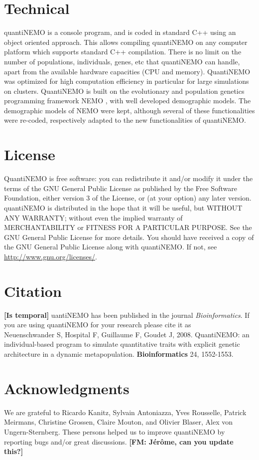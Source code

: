 \documentclass[letterpaper,12pt,oneside]{book}
\newcommand{\fm}[1]{\small {\bf \color{blue} [FM:  #1]} \normalsize}
\newcommand{\tbc}[1]{\small {\bf \color{red} [Is temporal]} \normalsize} %
\begin{document}
\section{Technical}
quantiNEMO is a console program, and is coded in standard C++ using an object oriented approach. This allows compiling quantiNEMO on any computer platform which supports standard C++ compilation. There is no limit on the number of populations, individuals, genes, etc that quantiNEMO can handle, apart from the available hardware capacities (CPU and memory). QuantiNEMO was optimized for high computation efficiency in particular for large simulations on clusters. QuantiNEMO is built on the evolutionary and population genetics programming framework NEMO \citep{Guillaume_2006}, with well developed demographic models. The demographic models of NEMO were kept, although several of these functionalities were re-coded, respectively adapted to the new functionalities of quantiNEMO.

\section{License}
QuantiNEMO is free software: you can redistribute it and/or modify it under the terms of the GNU General Public License as published by the Free Software Foundation, either version 3 of the License, or (at your option) any later version. quantiNEMO is distributed in the hope that it will be useful, but WITHOUT ANY WARRANTY; without even the implied warranty of MERCHANTABILITY or FITNESS FOR A PARTICULAR PURPOSE.  See the GNU General Public License for more details. You should have received a copy of the GNU General Public License along with quantiNEMO. If not, see \linebreak\url{http://www.gnu.org/licenses/}.

\section{Citation}
\tbc
quantiNEMO has been published in the journal \textit{Bioinformatics}. If you are using quantiNEMO for your research please cite it as \\
 Neuenschwander S, Hospital F, Guillaume F, Goudet J, 2008. QuantiNEMO: an individual-based program to simulate quantitative traits with explicit genetic architecture in a dynamic metapopulation. \textbf{Bioinformatics} 24, 1552-1553.

\section{Acknowledgments}
We are grateful to Ricardo Kanitz, Sylvain Antoniazza, Yves Rousselle, Patrick Meirmans, Christine Grossen, Claire Mouton, and Olivier Blaser, Alex von Ungern-Sternberg. These persons helped us to improve quantiNEMO by reporting bugs and/or great discussions. 
\fm{Jérôme, can you update this?}
\end{document}
